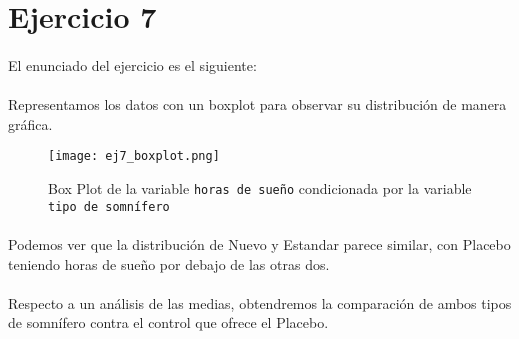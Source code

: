 \documentclass{article}
\begin{document}
  \maketitle

  \section{Ejercicio 7}

    \paragraph{}
    El enunciado del ejercicio es el siguiente: 

    \paragraph{}
    Representamos los datos con un boxplot para observar su distribución de manera gráfica.

    \begin{figure}[H]
      \centering
      \texttt{[image: ej7\_boxplot.png]}
      \caption{Box Plot de la variable \texttt{horas de sueño} condicionada por la variable \texttt{tipo de somnífero}}
      \label{fig:7_figura_1}
    \end{figure}
    \paragraph{}

    \paragraph{}
     Podemos ver que la distribución de Nuevo y Estandar parece similar, con Placebo teniendo horas de sueño por debajo de las otras dos.

    \paragraph{}
    Respecto a un análisis de las medias, obtendremos la comparación de ambos tipos de somnífero contra el control que ofrece el Placebo.
\end{document}
